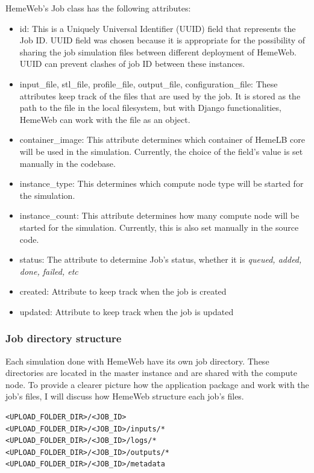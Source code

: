 HemeWeb's Job class has the following attributes:
\begin{itemize}
    \item id:  This is a Uniquely Universal Identifier (UUID) field that represents the Job ID. UUID field was chosen because it is appropriate for the possibility of sharing the job simulation files between different deployment of HemeWeb. UUID can prevent clashes of job ID between these instances.
    \item input\_file, stl\_file, profile\_file, output\_file, configuration\_file:  These attributes keep track of the files that are used by the job. It is stored as the path to the file in the local filesystem, but with Django functionalities, HemeWeb can work with the file as an object.
    \item container\_image:  This attribute determines which container of HemeLB core will be used in the simulation. Currently, the choice of the field's value is set manually in the codebase. 
    \item instance\_type: This determines which compute node type will be started for the simulation. 
    \item instance\_count: This attribute determines how many compute node will be started for the simulation. Currently, this is also set manually in the source code. 
    \item status: The attribute to determine Job's status, whether it is \textit{queued, added, done, failed, etc}
    \item created: Attribute to keep track when the job is created
    \item updated: Attribute to keep track when the job is updated 
\end{itemize}



\subsubsection{Job directory structure}

Each simulation done with HemeWeb have its own job directory. These directories are located in the master instance and are shared with the compute node. To provide a clearer picture how the application package and work with the job's files, I will discuss how HemeWeb structure each job's files.


\begin{lstlisting}[numbers=none]
<UPLOAD_FOLDER_DIR>/<JOB_ID>
<UPLOAD_FOLDER_DIR>/<JOB_ID>/inputs/*
<UPLOAD_FOLDER_DIR>/<JOB_ID>/logs/*
<UPLOAD_FOLDER_DIR>/<JOB_ID>/outputs/*
<UPLOAD_FOLDER_DIR>/<JOB_ID>/metadata
\end{lstlisting}

